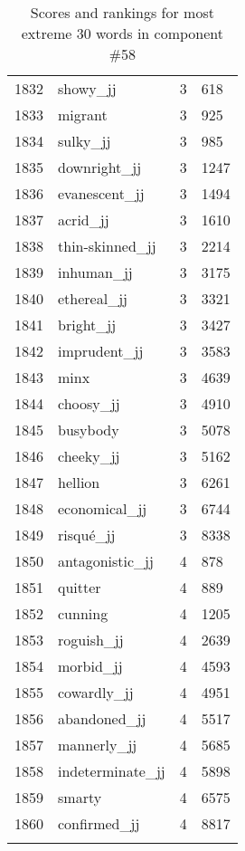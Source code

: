 \begin{longtable}[!htbp]{| rlr@{.}l |}
    1832 & showy\_jj & 3 & 618 \\
    1833 & migrant & 3 & 925 \\
    1834 & sulky\_jj & 3 & 985 \\
    1835 & downright\_jj & 3 & 1247 \\
    1836 & evanescent\_jj & 3 & 1494 \\
    1837 & acrid\_jj & 3 & 1610 \\
    1838 & thin-skinned\_jj & 3 & 2214 \\
    1839 & inhuman\_jj & 3 & 3175 \\
    1840 & ethereal\_jj & 3 & 3321 \\
    1841 & bright\_jj & 3 & 3427 \\
    1842 & imprudent\_jj & 3 & 3583 \\
    1843 & minx & 3 & 4639 \\
    1844 & choosy\_jj & 3 & 4910 \\
    1845 & busybody & 3 & 5078 \\
    1846 & cheeky\_jj & 3 & 5162 \\
    1847 & hellion & 3 & 6261 \\
    1848 & economical\_jj & 3 & 6744 \\
    1849 & risqué\_jj & 3 & 8338 \\
    1850 & antagonistic\_jj & 4 & 878 \\
    1851 & quitter & 4 & 889 \\
    1852 & cunning & 4 & 1205 \\
    1853 & roguish\_jj & 4 & 2639 \\
    1854 & morbid\_jj & 4 & 4593 \\
    1855 & cowardly\_jj & 4 & 4951 \\
    1856 & abandoned\_jj & 4 & 5517 \\
    1857 & mannerly\_jj & 4 & 5685 \\
    1858 & indeterminate\_jj & 4 & 5898 \\
    1859 & smarty & 4 & 6575 \\
    1860 & confirmed\_jj & 4 & 8817 \\
    \hline
    \caption{Scores and rankings for most extreme 30 words in component \#58} \\
\end{longtable}
